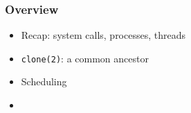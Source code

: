\begin{frame}

\frametitle{Overview}

\begin{itemize}

\item Recap: system calls, processes, threads

\item \texttt{clone(2)}: a common ancestor

\item Scheduling

\item \kudos{}

\end{itemize}

\end{frame}

